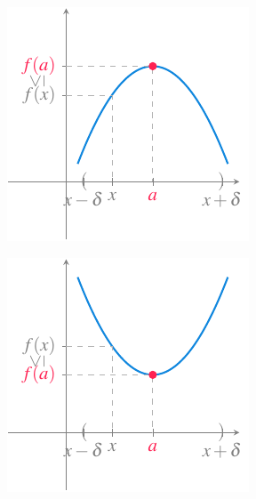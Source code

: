 \documentclass[
  a4paper,
]{scrreport}
\theoremstyle{definition}
\theoremstyle{plain}
\theoremstyle{definition}
\theoremstyle{definition}
\theoremstyle{plain}
\theoremstyle{plain}
\theoremstyle{remark}
\begin{document}
\begin{figure}

\begin{minipage}{0.50\linewidth}

\begin{figure}[H]

{\centering \includegraphics{./img/funciones/maximo.pdf}

}


\end{figure}%

\end{minipage}%
%
\begin{minipage}{0.50\linewidth}

\begin{figure}[H]

{\centering \includegraphics{./img/funciones/minimo.pdf}

}


\end{figure}%

\end{minipage}%

\end{figure}%
\end{document}
